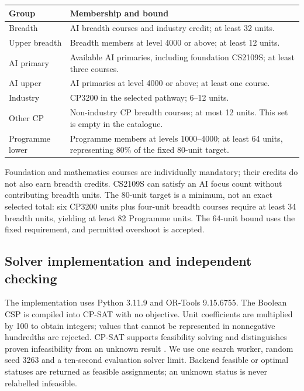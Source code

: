 \documentclass[11pt,a4paper]{article}
\begin{document}
\begin{center}
\begin{minipage}{\linewidth}
\centering
{}
\label{tab:groups}
\begin{tabularx}{\linewidth}{@{}lY@{}}
\toprule
Group & Membership and bound\\
\midrule
Breadth & AI breadth courses and industry credit; at least 32 units.\\
Upper breadth & Breadth members at level 4000 or above; at least 12 units.\\
AI primary & Available AI primaries, including foundation CS2109S; at least three courses.\\
AI upper & AI primaries at level 4000 or above; at least one course.\\
Industry & CP3200 in the selected pathway; 6--12 units.\\
Other CP & Non-industry CP breadth courses; at most 12 units. This set is empty in the catalogue.\\
Programme lower & Programme members at levels 1000--4000; at least 64 units, representing 80\% of the fixed 80-unit target.\\
\bottomrule
\end{tabularx}
\end{minipage}
\end{center}
Foundation and mathematics courses are individually mandatory; their credits
do not also earn breadth credits. CS2109S can satisfy an AI focus count
without contributing breadth units. The 80-unit target is a minimum, not an
exact selected total: six CP3200 units plus four-unit breadth courses require
at least 34 breadth units, yielding at least 82 Programme units. The 64-unit
bound uses the fixed requirement, and permitted overshoot is accepted.

\subsection{Solver implementation and independent checking}
The implementation uses Python 3.11.9 and OR-Tools 9.15.6755. The Boolean
CSP is compiled into CP-SAT with no objective. Unit coefficients are multiplied
by 100 to obtain integers; values that cannot be represented in nonnegative
hundredths are rejected. CP-SAT supports feasibility solving and distinguishes
proven infeasibility from an unknown result \cite{cpsat}. We use one search
worker, random seed 3263 and a ten-second evaluation solver limit.
Backend feasible or optimal statuses are returned as feasible assignments;
an unknown status is never relabelled infeasible.
\end{document}
